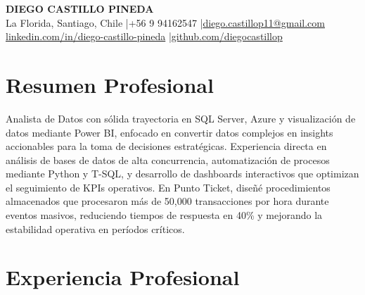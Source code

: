\documentclass[11pt,letterpaper]{article}
\begin{document}
\begin{center}
{\fontsize{16}{19}\selectfont\textbf{\MakeUppercase{Diego Castillo Pineda}}}\\[4pt]
{\small La Florida, Santiago, Chile \quad|\quad +56 9 94162547 \quad|\quad \href{mailto:diego.castillop11@gmail.com}{diego.castillop11@gmail.com}\\
\href{https://linkedin.com/in/diego-castillo-pineda}{linkedin.com/in/diego-castillo-pineda} \quad|\quad \href{https://github.com/diegocastillop}{github.com/diegocastillop}}
\end{center}

\section{Resumen Profesional}
Analista de Datos con sólida trayectoria en SQL Server, Azure y visualización de datos mediante Power BI, enfocado en convertir datos complejos en insights accionables para la toma de decisiones estratégicas. Experiencia directa en análisis de bases de datos de alta concurrencia, automatización de procesos mediante Python y T-SQL, y desarrollo de dashboards interactivos que optimizan el seguimiento de KPIs operativos. En Punto Ticket, diseñé procedimientos almacenados que procesaron más de 50,000 transacciones por hora durante eventos masivos, reduciendo tiempos de respuesta en 40\% y mejorando la estabilidad operativa en períodos críticos.

\section{Experiencia Profesional}
\end{document}
